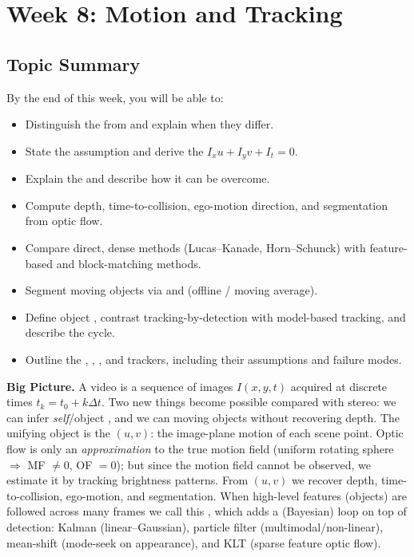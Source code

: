 \section{Week 8: Motion and Tracking}

\subsection{Topic Summary}

\begin{keybox}
By the end of this week, you will be able to:
\begin{itemize}
  \item Distinguish the  from  and explain when they differ.
  \item State the  assumption and derive the  $I_x u + I_y v + I_t = 0$.
  \item Explain the  and describe how it can be overcome.
  \item Compute depth, time-to-collision, ego-motion direction, and segmentation from optic flow.
  \item Compare direct, dense methods (Lucas--Kanade, Horn--Schunck) with feature-based and block-matching methods.
  \item Segment moving objects via  and  (offline / moving average).
  \item Define object , contrast tracking-by-detection with model-based tracking, and describe the  cycle.
  \item Outline the , , , and  trackers, including their assumptions and failure modes.
\end{itemize}
\end{keybox}

\textbf{Big Picture.}
A video is a sequence of images $I(x,y,t)$ acquired at discrete times $t_k = t_0 + k\Delta t$. Two new things become possible compared with stereo: we can infer \emph{self}/object , and we can  moving objects without recovering depth. The unifying object is the  $(u,v)$: the image-plane motion of each scene point. Optic flow is only an \emph{approximation} to the true motion field (uniform rotating sphere $\Rightarrow$ MF $\neq 0$, OF $=0$); but since the motion field cannot be observed, we estimate it by tracking brightness patterns. From $(u,v)$ we recover depth, time-to-collision, ego-motion, and segmentation. When high-level features (objects) are followed across many frames we call this , which adds a  (Bayesian) loop on top of detection: Kalman (linear--Gaussian), particle filter (multimodal/non-linear), mean-shift (mode-seek on appearance), and KLT (sparse feature optic flow).

